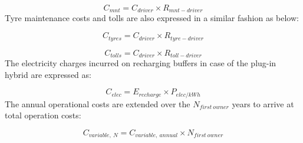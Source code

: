 \documentclass[ExampleMasters.tex]{subfiles}
\begin{document}
			\begin{equation}
				C_{mnt} = C_{driver} \times R_{mnt-driver}
			\end{equation}
			Tyre maintenance costs and tolls are also expressed in a similar fashion as below:

			\begin{equation}
				C_{tyres} = C_{driver} \times R_{tyre-driver}
			\end{equation}

			\begin{equation}
				C_{tolls} = C_{driver} \times R_{toll-driver}
			\end{equation}
			The electricity charges incurred on recharging buffers in case of the plug-in hybrid are expressed as:

			\begin{equation}
				C_{elec} = E_{recharge} \times P_{elec/kWh}
			\end{equation}
			The annual operational costs are extended over the $N_{first\ owner}$ years to arrive at total operation costs:

			\begin{equation}
				C_{variable,\ N} = C_{variable,\ annual} \times N_{first\ owner}
			\end{equation}
\end{document}
